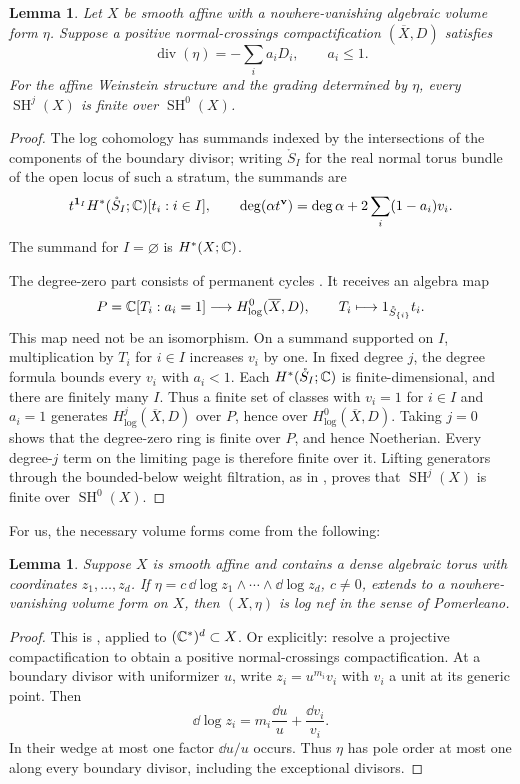 \documentclass[12pt, letter]{amsart}
\newtheorem{lemma}[theorem]{Lemma}
\theoremstyle{definition}
\newcommand{\SH}{\operatorname{SH}}
\numberwithin{equation}{section}
\begin{document}
\begin{lemma} \label{lem:degreewise} 
Let $X$ be smooth affine with a nowhere-vanishing algebraic volume
form $\eta$. Suppose a positive normal-crossings compactification
$(\overline X,D)$ satisfies
\[
 \operatorname{div}(\eta)=-\sum_i a_iD_i,\qquad a_i\le1.
\]
For the affine Weinstein structure and the grading determined by $\eta$, every $\SH^j(X)$ is finite over
$\SH^0(X)$.
\end{lemma}
\begin{proof}
The log cohomology has summands indexed by the intersections of the components of the boundary divisor; writing $\mathring S_I$ for the real normal torus bundle of the open locus of such a stratum, the summands are
\[
 t^{\mathbf1_I}H^*(\mathring S_I;\mathbb C)[t_i:i\in I],\qquad
 \deg(\alpha t^{\mathbf v})
 =\deg\alpha+2\sum_i(1-a_i)v_i.
\]
The summand for $I=\varnothing$ is $H^*(X;\mathbb C)$.


The degree-zero part consists of permanent cycles
\cite[Theorem~4.21 and Corollary~4.22]{Pom}.
It receives an algebra map
\[
 P=\mathbb C[T_i:a_i=1]\longrightarrow H^0_{\log}(\overline X,D),
 \qquad T_i\longmapsto 1_{\mathring S_{\{i\}}}t_i.
\]
This map need not be an isomorphism.
On a summand supported on $I$, multiplication by $T_i$ for $i\in I$
increases $v_i$ by one.
In fixed degree $j$, the degree formula bounds every $v_i$ with
$a_i<1$.
Each $H^*(\mathring S_I;\mathbb C)$ is finite-dimensional, and there are
finitely many $I$.
Thus a finite set of classes with $v_i=1$ for $i\in I$ and $a_i=1$
generates $H^j_{\log}(\overline X,D)$ over $P$, hence over
$H^0_{\log}(\overline X,D)$.
Taking $j=0$ shows that the degree-zero ring is finite over $P$,
and hence Noetherian.
Every degree-$j$ term on the limiting page is therefore finite over it.
Lifting generators through the bounded-below weight filtration, as in
\cite[Lemma~4.24]{Pom}, proves that $\SH^j(X)$ is finite over $\SH^0(X)$.
\end{proof}

For us, the necessary volume forms come from the following:


\begin{lemma}\label{lem:log-volume} 
Suppose $X$ is smooth affine and contains a dense algebraic torus
with coordinates $z_1,\ldots,z_d$. If
$\eta=c\,\dd\log z_1\wedge\cdots\wedge\dd\log z_d$, $c\ne0$,
extends to a nowhere-vanishing volume form on $X$, then $(X, \eta)$ is log nef in the sense of Pomerleano. 
\end{lemma}
\begin{proof}
This is \cite[Lemma~1.4(1)]{GHK}, applied to
$(\mathbb C^*)^d\subset X$.  Or explicitly:
resolve a projective compactification to obtain a positive
normal-crossings compactification.
At a boundary divisor with uniformizer $u$, write $z_i=u^{m_i}v_i$
with $v_i$ a unit at its generic point. Then
\[
 \dd\log z_i=m_i\frac{\dd u}{u}+\frac{\dd v_i}{v_i}.
\]
In their wedge at most one factor $\dd u/u$ occurs. Thus $\eta$
has pole order at most one along every boundary divisor,
including the exceptional divisors.
\end{proof}
\end{document}
